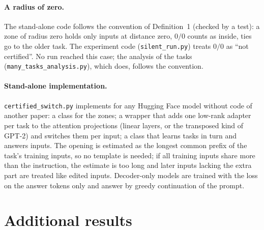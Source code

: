 \paragraph{A radius of zero.} The stand-alone code follows the convention of Definition~1 (checked by a test): a zone of radius zero holds only inputs at distance zero, $0/0$ counts as inside, ties go to the older task. The experiment code (\texttt{silent\_run.py}) treats $0/0$ as ``not certified''. No run reached this case; the analysis of the \ManyTasks{} tasks (\texttt{many\_tasks\_analysis.py}), which does, follows the convention.

\paragraph{Stand-alone implementation.} \texttt{certified\_switch.py} implements \cert{} for any Hugging Face model without code of another paper: a class for the zones; a wrapper that adds one low-rank adapter per task to the attention projections (linear layers, or the transposed kind of GPT-2) and switches them per input; a class that learns tasks in turn and answers inputs. The opening is estimated as the longest common prefix of the task's training inputs, so no template is needed; if all training inputs share more than the instruction, the estimate is too long and later inputs lacking the extra part are treated like edited inputs. Decoder-only models are trained with the loss on the answer tokens only and answer by greedy continuation of the prompt.

\clearpage
\section{Additional results}
\label{app:more}

\begin{table}[h]
  \caption{Five tasks: scores written by the official script, which compares each answer with one
  randomly picked reference answer.}
  \label{tab:fiveofficial}
  \centering
  \small
  
\end{table}

\begin{table}[h]
  \caption{Five tasks: score right after learning (Learned) and forgetting (FT) for each wording.}
  \label{tab:fivemore}
  \centering
  \small
  
\end{table}

\begin{table}[h]
  \caption{Five tasks, original wording: score of each task right after it was learned $\to$ after
  the last task.}
  \label{tab:fivepertask}
  \centering
  \small
  
\end{table}

